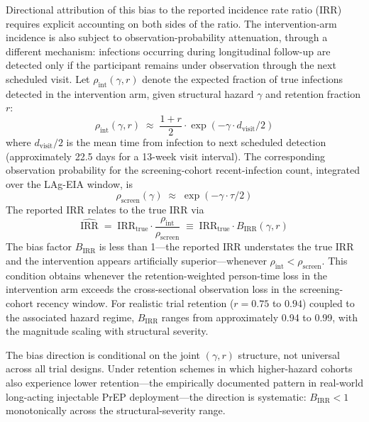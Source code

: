 \documentclass[11pt]{article}
\begin{document}
Directional attribution of this bias to the reported incidence rate ratio (IRR) requires explicit accounting on both sides of the ratio. The intervention-arm incidence is also subject to observation-probability attenuation, through a different mechanism: infections occurring during longitudinal follow-up are detected only if the participant remains under observation through the next scheduled visit. Let $\rho_{\mathrm{int}}(\gamma, r)$ denote the expected fraction of true infections detected in the intervention arm, given structural hazard $\gamma$ and retention fraction $r$:
\begin{equation}
\rho_{\mathrm{int}}(\gamma, r) \;\approx\; \frac{1+r}{2} \cdot \exp(-\gamma \cdot d_{\mathrm{visit}}/2) \label{eq:rho_int}
\end{equation}
where $d_{\mathrm{visit}}/2$ is the mean time from infection to next scheduled detection (approximately 22.5 days for a 13-week visit interval). The corresponding observation probability for the screening-cohort recent-infection count, integrated over the LAg-EIA window, is
\begin{equation}
\rho_{\mathrm{screen}}(\gamma) \;\approx\; \exp(-\gamma \cdot \tau/2) \label{eq:rho_screen}
\end{equation}
The reported IRR relates to the true IRR via
\begin{equation}
\boxed{\;\widehat{\mathrm{IRR}} \;=\; \mathrm{IRR}_{\mathrm{true}} \cdot \frac{\rho_{\mathrm{int}}}{\rho_{\mathrm{screen}}} \;\equiv\; \mathrm{IRR}_{\mathrm{true}} \cdot B_{\mathrm{IRR}}(\gamma, r)\;} \label{eq:birr}
\end{equation}
The bias factor $B_{\mathrm{IRR}}$ is less than 1---the reported IRR understates the true IRR and the intervention appears artificially superior---whenever $\rho_{\mathrm{int}} < \rho_{\mathrm{screen}}$. This condition obtains whenever the retention-weighted person-time loss in the intervention arm exceeds the cross-sectional observation loss in the screening-cohort recency window. For realistic trial retention ($r = 0.75$ to $0.94$) coupled to the associated hazard regime, $B_{\mathrm{IRR}}$ ranges from approximately 0.94 to 0.99, with the magnitude scaling with structural severity.

The bias direction is conditional on the joint $(\gamma, r)$ structure, not universal across all trial designs. Under retention schemes in which higher-hazard cohorts also experience lower retention---the empirically documented pattern in real-world long-acting injectable PrEP deployment---the direction is systematic: $B_{\mathrm{IRR}} < 1$ monotonically across the structural-severity range.
\end{document}

